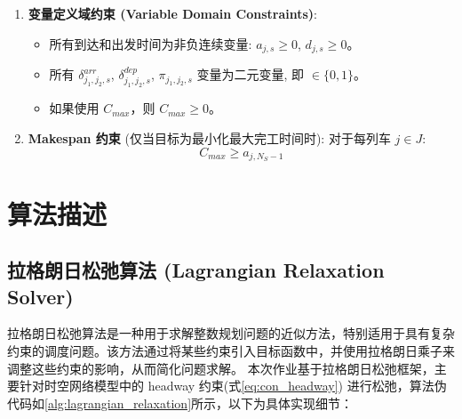 \documentclass{article}
\begin{document}
\begin{enumerate}
        \item \textbf{变量定义域约束 (Variable Domain Constraints)}:
        \begin{itemize}
            \item 所有到达和出发时间为非负连续变量: $a_{j,s} \ge 0$, $d_{j,s} \ge 0$。
            \item 所有 $\delta^{arr}_{j_1,j_2,s}$, $\delta^{dep}_{j_1,j_2,s}$, $\pi_{j_1,j_2,s}$ 变量为二元变量, 即 $\in \{0,1\}$。
            \item 如果使用 $C_{max}$，则 $C_{max} \ge 0$。
        \end{itemize}

        \item \textbf{Makespan 约束} (仅当目标为最小化最大完工时间时): 对于每列车 $j \in J$:
        \begin{equation}
            C_{max} \ge a_{j,N_S-1}\label{eq:makespan_constraint}
        \end{equation}
    \end{enumerate}


    \section{算法描述}
    \label{sec:algo_desc}

    \subsection{拉格朗日松弛算法 (Lagrangian Relaxation Solver)}
    拉格朗日松弛算法是一种用于求解整数规划问题的近似方法，特别适用于具有复杂约束的调度问题。该方法通过将某些约束引入目标函数中，并使用拉格朗日乘子来调整这些约束的影响，从而简化问题求解。
    本次作业基于拉格朗日松弛框架，主要针对时空网络模型中的 headway 约束(式\ref{eq:con_headway}) 进行松弛，算法伪代码如\ref{alg:lagrangian_relaxation}所示，以下为具体实现细节：
\end{document}
